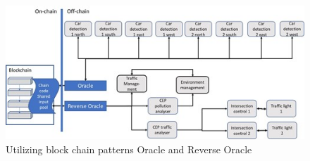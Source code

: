 \begin{figure}[htbp]
	\centering
	\includegraphics[width=0.9\linewidth]{Figures/Chapter5/figuresshared/Block-Chain.jpg}
	\caption[Utilizing block chain patterns Oracle and Reverse Oracle]{Utilizing block chain patterns Oracle and Reverse Oracle}
	\label{fig:sharedblockchain}
\end{figure}


